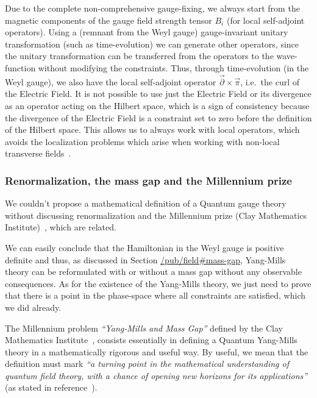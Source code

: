 \documentclass[11pt]{book}
\begin{document}
Due to the complete non-comprehensive gauge-fixing, we always start from
the magnetic components of the gauge field strength tensor \(B_{i}\)
(for local self-adjoint operators). Using a (remnant from the Weyl
gauge) gauge-invariant unitary transformation (such as time-evolution)
we can generate other operators, since the unitary transformation can be
transferred from the operators to the wave-function without modifying
the constraints. Thus, through time-evolution (in the Weyl gauge), we
also have the local self-adjoint operator
\(\vec{\partial} \times \vec{\pi}\), i.e.~the curl of the Electric
Field. It is not possible to use just the Electric Field or its
divergence as an operator acting on the Hilbert space, which is a sign
of consistency because the divergence of the Electric Field is a
constraint set to zero before the definition of the Hilbert space. This
allows us to always work with local operators, which avoids the
localization problems which arise when working with non-local transverse
fields~\cite{Keller2005On}.

\hypertarget{renormalization-the-mass-gap-and-the-millennium-prize}{%
\subsubsection{Renormalization, the mass gap and the Millennium
prize}\label{renormalization-the-mass-gap-and-the-millennium-prize}}

We couldn't propose a mathematical definition of a Quantum gauge theory
without discussing renormalization and the Millennium prize (Clay
Mathematics Institute)~\cite{Jaffe2006Quantum}, which are related.

We can easily conclude that the Hamiltonian in the Weyl gauge is
positive definite and thus, as discussed in Section
\href{https://timepiece.pubpub.org/pub/field\#mass-gap}{/pub/field\#mass-gap},
Yang-Mills theory can be reformulated with or without a mass gap without
any observable consequences. As for the existence of the Yang-Mills
theory, we just need to prove that there is a point in the phase-space
where all constraints are satisfied, which we did already.

The Millennium problem \emph{``Yang-Mills and Mass Gap''} defined by the
Clay Mathematics
Institute~\cite{Jaffe2006Quantum}, consists essentially in defining a Quantum Yang-Mills theory in
a mathematically rigorous and useful way. By useful, we mean that the
definition must mark \emph{``a turning point in the mathematical
understanding of quantum field theory, with a chance of opening new
horizons for its applications''} (as stated in
reference~\cite{Jaffe2006Quantum}).
\end{document}
